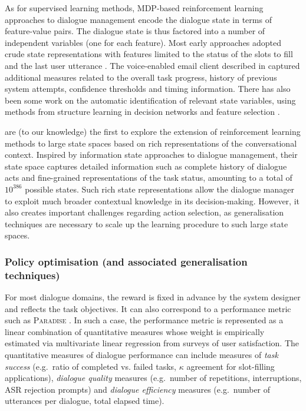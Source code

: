 As for supervised learning methods, MDP-based reinforcement learning approaches to dialogue management encode the dialogue state in terms of feature-value pairs.  The dialogue state is thus factored into a number of independent variables (one for each feature).  Most early approaches adopted crude state representations with features limited to the status of the slots to fill and the last user utterance \citep{817450,Singh:2000:EER:647288.723412,Scheffler:2002}.  The voice-enabled email client described in \cite{Walker:2000} captured additional measures related to the overall task progress, history of previous system attempts, confidence thresholds and timing information.  There has also been some work on the automatic identification of relevant state variables, using methods from structure learning in decision networks \citep{PaekC06} and feature selection \citep{tetreault2006using}. 

\cite{Henderson:2008} are (to our knowledge) the first to explore the extension of reinforcement learning methods to large state spaces based on rich representations of the conversational context. Inspired by information state approaches to dialogue management, their state space captures detailed information such as complete history of dialogue acts and fine-grained representations of the task status, amounting to a total of $10^{386}$ possible states.  Such rich state representations allow the dialogue manager to exploit much broader contextual knowledge in its decision-making.  However, it also creates important challenges regarding action selection, as generalisation techniques are necessary to scale up the learning procedure to such large state spaces.

\subsubsection{Policy optimisation (and associated generalisation techniques)}

For most dialogue domains, the reward is fixed in advance by the system designer and reflects the task objectives.  It can also correspond to a performance metric such as \textsc{Paradise} \citep{Walker:2000}.  In such a case, the performance metric is represented as a linear combination of quantitative measures whose weight is empirically estimated via multivariate linear regression from surveys of user satisfaction.  The quantitative measures of dialogue performance can include measures of \textit{task success} (e.g.\ ratio of completed vs. failed tasks, $\kappa$ agreement for slot-filling applications), \textit{dialogue quality} measures (e.g.\ number of repetitions, interruptions, ASR rejection prompts) and \textit{dialogue efficiency} measures (e.g.\ number of utterances per dialogue, total elapsed time).

